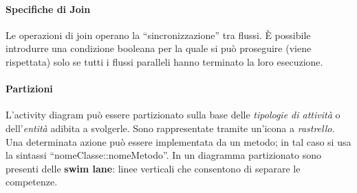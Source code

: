 \begin{figure}[H]
    \hfill
\end{figure}

\paragraph{Specifiche di Join} Le operazioni di join operano la “sincronizzazione” tra flussi. È possibile introdurre una condizione booleana per la quale si può proseguire (viene rispettata) solo se tutti i flussi paralleli hanno terminato la loro esecuzione.

\paragraph{Partizioni} L'activity diagram può essere partizionato sulla base delle \textit{tipologie di attività} o dell'\textit{entità} adibita a svolgerle. Sono rappresentate tramite un'icona a \textit{rastrello}. Una determinata azione può essere implementata da un metodo; in tal caso si usa la sintassi “nomeClasse::nomeMetodo”. In un diagramma partizionato sono presenti delle \textbf{swim lane}: linee verticali che consentono di separare le competenze.

